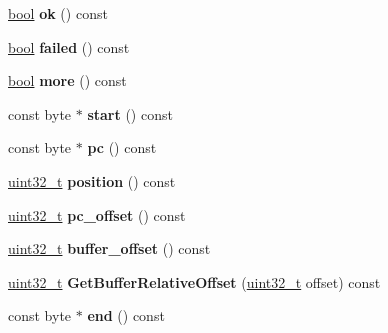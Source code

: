 \begin{DoxyCompactItemize}
\mbox{\hyperlink{classbool}{bool}} {\bfseries ok} () const
\item 
\mbox{\label{classv8_1_1internal_1_1wasm_1_1Decoder_aaae646d725c3032851e1d627c2957af5}} 
\mbox{\hyperlink{classbool}{bool}} {\bfseries failed} () const
\item 
\mbox{\label{classv8_1_1internal_1_1wasm_1_1Decoder_af262b9662db06b39d15fff65d52dab9c}} 
\mbox{\hyperlink{classbool}{bool}} {\bfseries more} () const
\item 
\mbox{\label{classv8_1_1internal_1_1wasm_1_1Decoder_a7f41c44be53ee9c1d0475cc11731ed04}} 
const byte $\ast$ {\bfseries start} () const
\item 
\mbox{\label{classv8_1_1internal_1_1wasm_1_1Decoder_aa6e43ee94fae20f7100fbec2cd84a61f}} 
const byte $\ast$ {\bfseries pc} () const
\item 
\mbox{\label{classv8_1_1internal_1_1wasm_1_1Decoder_a726cc6b25933530cd98cd5bfe883edd4}} 
\mbox{\hyperlink{classuint32__t}{uint32\+\_\+t}} {\bfseries position} () const
\item 
\mbox{\label{classv8_1_1internal_1_1wasm_1_1Decoder_ab9ad31b5a9b617078aeb067b6bc91175}} 
\mbox{\hyperlink{classuint32__t}{uint32\+\_\+t}} {\bfseries pc\+\_\+offset} () const
\item 
\mbox{\label{classv8_1_1internal_1_1wasm_1_1Decoder_af02465affeb4727819af4ad53d6945a5}} 
\mbox{\hyperlink{classuint32__t}{uint32\+\_\+t}} {\bfseries buffer\+\_\+offset} () const
\item 
\mbox{\label{classv8_1_1internal_1_1wasm_1_1Decoder_a91e3812d0c67a656b30dd67ac0df59b2}} 
\mbox{\hyperlink{classuint32__t}{uint32\+\_\+t}} {\bfseries Get\+Buffer\+Relative\+Offset} (\mbox{\hyperlink{classuint32__t}{uint32\+\_\+t}} offset) const
\item 
\mbox{\label{classv8_1_1internal_1_1wasm_1_1Decoder_aee3d8a6d194a0e1c5b6af4e7ef7277f5}} 
const byte $\ast$ {\bfseries end} () const
\end{DoxyCompactItemize}
